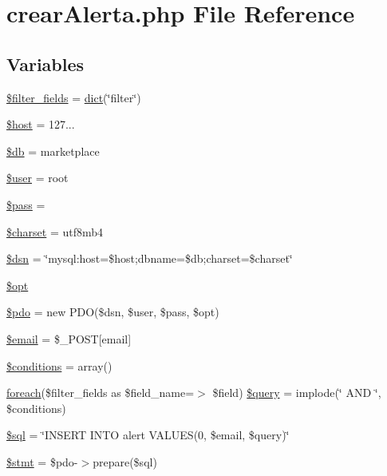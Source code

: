 \hypertarget{crear_alerta_8php}{}\section{crear\+Alerta.\+php File Reference}
\label{crear_alerta_8php}
\subsection*{Variables}
\begin{DoxyCompactItemize}
\item 
\hyperlink{crear_alerta_8php_ac67f04ebdc4f44ec9102c15a0ea745fd}{\$filter\+\_\+fields} = \hyperlink{dict_8php_a06bc942ddeb3d0d20410b67298781449}{dict}(\char`\"{}filter\char`\"{})
\item 
\hyperlink{crear_alerta_8php_a711797613cb863ca0756df789c396bf2}{\$host} = \textquotesingle{}127...\textquotesingle{}
\item 
\hyperlink{crear_alerta_8php_a1fa3127fc82f96b1436d871ef02be319}{\$db} = \textquotesingle{}marketplace\textquotesingle{}
\item 
\hyperlink{crear_alerta_8php_a598ca4e71b15a1313ec95f0df1027ca5}{\$user} = \textquotesingle{}root\textquotesingle{}
\item 
\hyperlink{crear_alerta_8php_a12ec2780b52bd1c54d38c2f981c0349f}{\$pass} = \textquotesingle{}\textquotesingle{}
\item 
\hyperlink{crear_alerta_8php_af10158dd74b75f1d337e83102d6b82ce}{\$charset} = \textquotesingle{}utf8mb4\textquotesingle{}
\item 
\hyperlink{crear_alerta_8php_a6441cca8c9fa11e16d2017e8cb733c10}{\$dsn} = \char`\"{}mysql\+:host=\$host;dbname=\$db;charset=\$charset\char`\"{}
\item 
\hyperlink{crear_alerta_8php_a7fef1cb364d4fb76ac905a9b9fa60c68}{\$opt}
\item 
\hyperlink{crear_alerta_8php_a5766efd703cef0e00bfc06b3f3acbe0e}{\$pdo} = new P\+DO(\$dsn, \$user, \$pass, \$opt)
\item 
\hyperlink{crear_alerta_8php_ad634f418b20382e2802f80532d76d3cd}{\$email} = \$\+\_\+\+P\+O\+ST\mbox{[}\textquotesingle{}email\textquotesingle{}\mbox{]}
\item 
\hyperlink{crear_alerta_8php_a9063938de963da33209dd9353fdc768f}{\$conditions} = array()
\item 
\hyperlink{lista_ofertas_8php_ac5fb0d39759ff645b2b7df05daca83eb}{foreach}(\$filter\+\_\+fields as \$field\+\_\+name=$>$ \$field) \hyperlink{crear_alerta_8php_abfa9406378a774b140463b5b09d1ce54}{\$query} = implode(\char`\"{} A\+ND \char`\"{}, \$conditions)
\item 
\hyperlink{crear_alerta_8php_a047170d6020a882807665812a27e2525}{\$sql} = \char`\"{}I\+N\+S\+E\+RT I\+N\+TO alert V\+A\+L\+U\+ES(\textquotesingle{}0\textquotesingle{}, \textquotesingle{}\$email\textquotesingle{}, \textquotesingle{}\$query\textquotesingle{})\char`\"{}
\item 
\hyperlink{crear_alerta_8php_af27a9140d5f2658693e7fd107f716449}{\$stmt} = \$pdo-\/$>$prepare(\$sql)
\end{DoxyCompactItemize}


